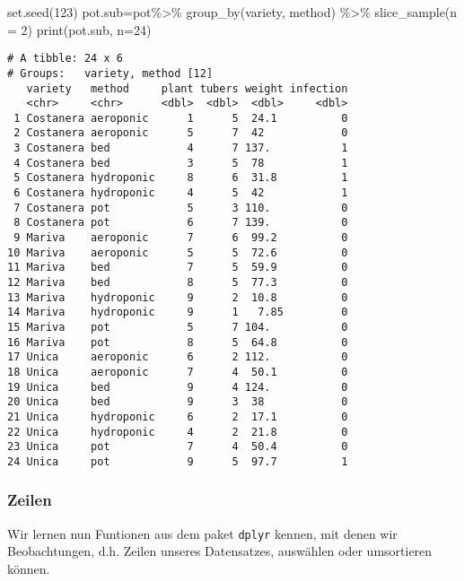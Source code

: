 \documentclass[
  letterpaper,
  DIV=11,
  numbers=noendperiod]{scrartcl}
\newenvironment{Shaded}{\begin{snugshade}}{\end{snugshade}}
\newcommand{\AttributeTok}[1]{\textcolor[rgb]{0.40,0.45,0.13}{#1}}
\newcommand{\DecValTok}[1]{\textcolor[rgb]{0.68,0.00,0.00}{#1}}
\newcommand{\FunctionTok}[1]{\textcolor[rgb]{0.28,0.35,0.67}{#1}}
\newcommand{\NormalTok}[1]{\textcolor[rgb]{0.00,0.23,0.31}{#1}}
\newcommand{\OtherTok}[1]{\textcolor[rgb]{0.00,0.23,0.31}{#1}}
\newcommand{\SpecialCharTok}[1]{\textcolor[rgb]{0.37,0.37,0.37}{#1}}
\begin{document}
\begin{Shaded}
\begin{Highlighting}[]
\FunctionTok{set.seed}\NormalTok{(}\DecValTok{123}\NormalTok{)}
\NormalTok{pot.sub}\OtherTok{=}\NormalTok{pot}\SpecialCharTok{\%\textgreater{}\%} 
    \FunctionTok{group\_by}\NormalTok{(variety, method) }\SpecialCharTok{\%\textgreater{}\%}
    \FunctionTok{slice\_sample}\NormalTok{(}\AttributeTok{n =} \DecValTok{2}\NormalTok{)}
\FunctionTok{print}\NormalTok{(pot.sub, }\AttributeTok{n=}\DecValTok{24}\NormalTok{)}
\end{Highlighting}
\end{Shaded}

\begin{verbatim}
# A tibble: 24 x 6
# Groups:   variety, method [12]
   variety   method     plant tubers weight infection
   <chr>     <chr>      <dbl>  <dbl>  <dbl>     <dbl>
 1 Costanera aeroponic      1      5  24.1          0
 2 Costanera aeroponic      5      7  42            0
 3 Costanera bed            4      7 137.           1
 4 Costanera bed            3      5  78            1
 5 Costanera hydroponic     8      6  31.8          1
 6 Costanera hydroponic     4      5  42            1
 7 Costanera pot            5      3 110.           0
 8 Costanera pot            6      7 139.           0
 9 Mariva    aeroponic      7      6  99.2          0
10 Mariva    aeroponic      5      5  72.6          0
11 Mariva    bed            7      5  59.9          0
12 Mariva    bed            8      5  77.3          0
13 Mariva    hydroponic     9      2  10.8          0
14 Mariva    hydroponic     9      1   7.85         0
15 Mariva    pot            5      7 104.           0
16 Mariva    pot            8      5  64.8          0
17 Unica     aeroponic      6      2 112.           0
18 Unica     aeroponic      7      4  50.1          0
19 Unica     bed            9      4 124.           0
20 Unica     bed            9      3  38            0
21 Unica     hydroponic     6      2  17.1          0
22 Unica     hydroponic     4      2  21.8          0
23 Unica     pot            7      4  50.4          0
24 Unica     pot            9      5  97.7          1
\end{verbatim}

\hypertarget{zeilen}{%
\subsubsection{Zeilen}\label{zeilen}}

Wir lernen nun Funtionen aus dem paket \texttt{dplyr} kennen, mit denen
wir Beobachtungen, d.h. Zeilen unseres Datensatzes, auswählen oder
umsortieren können.
\end{document}
